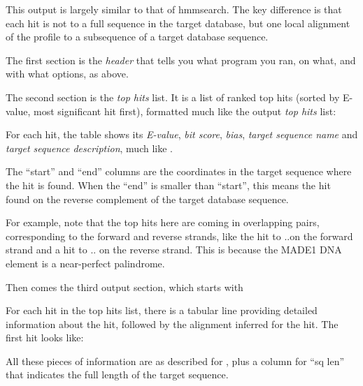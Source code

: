 This output is largely similar to that of hmmsearch. The key
difference is that each hit is not to a full sequence in the target
database, but one local alignment of the profile to a subsequence of a
target database sequence.

The first section is the \emph{header} that tells you what program you
ran, on what, and with what options, as above.

The second section is the \emph{top hits} list. It is a list
of ranked top hits (sorted by E-value, most significant hit first),
formatted much like the  output \emph{top hits} list:


For each hit, the table shows its \emph{E-value}, \emph{bit score},
\emph{bias}, \emph{target sequence name} and \emph{target sequence
  description}, much like .

The ``start'' and ``end'' columns are the coordinates in the target
sequence where the hit is found. When the ``end'' is smaller than
``start'', this means the hit found on the reverse complement of the
target database sequence.

For example, note that the top hits here are coming in overlapping
pairs, corresponding to the forward and reverse strands, like the hit
to \NMHafrom{}..\NMHato on the forward strand and a hit to
\NMHbfrom{}..\NMHbto{} on the reverse strand. This is because the
MADE1 DNA element is a near-perfect palindrome.

Then comes the third output section, which starts with


For each hit in the top hits list, there is a tabular line
providing detailed information about the hit, followed by the alignment
inferred for the hit. The first  hit
looks like: 


All these pieces of information are as described for ,
plus a column for ``sq len'' that indicates the full length of the
target sequence.

